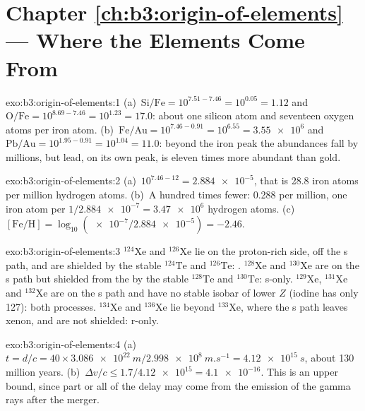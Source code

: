 \section*{Chapter \ref{ch:b3:origin-of-elements} --- Where the Elements Come From}

\begin{solution}{exo:b3:origin-of-elements:1}
(a)~$\mathrm{Si/Fe} = 10^{7.51 - 7.46} = 10^{0.05} = 1.12$ and
$\mathrm{O/Fe} = 10^{8.69 - 7.46} = 10^{1.23} = 17.0$: about one silicon
atom and seventeen oxygen atoms per iron atom. (b)~$\mathrm{Fe/Au} =
10^{7.46 - 0.91} = 10^{6.55} = \num{3.55e6}$ and $\mathrm{Pb/Au} =
10^{1.95 - 0.91} = 10^{1.04} = 11.0$: beyond the iron peak the abundances
fall by millions, but lead, on its own peak, is eleven times more
abundant than gold.
\end{solution}

\begin{solution}{exo:b3:origin-of-elements:2}
(a)~$10^{7.46 - 12} = \num{2.884e-5}$, that is \num{28.8} iron atoms per
million hydrogen atoms. (b)~A hundred times fewer: \num{0.288} per
million, one iron atom per $1/\num{2.884e-7} = \num{3.47e6}$ hydrogen
atoms. (c)~$[\mathrm{Fe/H}] = \log_{10}(\num{e-7}/\num{2.884e-5}) =
-2.46$.
\end{solution}

\begin{solution}{exo:b3:origin-of-elements:3}
$^{124}\mathrm{Xe}$ and $^{126}\mathrm{Xe}$ lie on the proton-rich side,
off the s path, and are shielded by the stable $^{124}\mathrm{Te}$ and
$^{126}\mathrm{Te}$: . $^{128}\mathrm{Xe}$ and $^{130}\mathrm{Xe}$
are on the s path but shielded from the  by the stable
$^{128}\mathrm{Te}$ and $^{130}\mathrm{Te}$: s-only. $^{129}\mathrm{Xe}$,
$^{131}\mathrm{Xe}$ and $^{132}\mathrm{Xe}$ are on the s path and have no
stable isobar of lower $Z$ (iodine has only 127): both processes.
$^{134}\mathrm{Xe}$ and $^{136}\mathrm{Xe}$ lie beyond
$^{133}\mathrm{Xe}$, where the s path leaves xenon, and are not
shielded: r-only.
\end{solution}

\begin{solution}{exo:b3:origin-of-elements:4}
(a)~$t = d/c = 40\times\qty{3.086e22}{m}/\qty{2.998e8}{m.s^{-1}} =
\qty{4.12e15}{s}$, about \num{130} million years. (b)~$\Delta v/c \le
1.7/\num{4.12e15} = \num{4.1e-16}$. This is an upper bound, since part or
all of the delay may come from the emission of the gamma rays after the
merger.
\end{solution}

